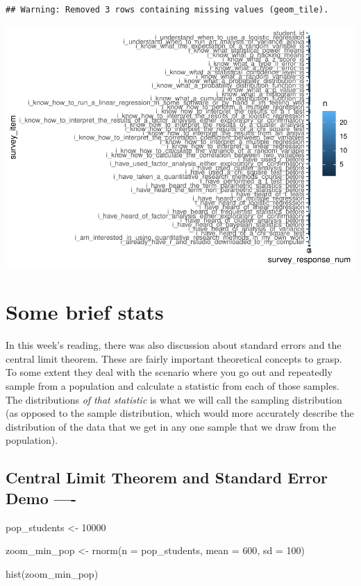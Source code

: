 \documentclass[
]{book}
\newenvironment{Shaded}{\begin{snugshade}}{\end{snugshade}}
\newcommand{\AttributeTok}[1]{\textcolor[rgb]{0.77,0.63,0.00}{#1}}
\newcommand{\DecValTok}[1]{\textcolor[rgb]{0.00,0.00,0.81}{#1}}
\newcommand{\FunctionTok}[1]{\textcolor[rgb]{0.00,0.00,0.00}{#1}}
\newcommand{\NormalTok}[1]{#1}
\newcommand{\OtherTok}[1]{\textcolor[rgb]{0.56,0.35,0.01}{#1}}
\begin{document}
\begin{verbatim}
## Warning: Removed 3 rows containing missing values (geom_tile).
\end{verbatim}

\includegraphics{test_course_notes_files/figure-latex/unnamed-chunk-17-1.pdf}

\hypertarget{some-brief-stats}{%
\section{Some brief stats}\label{some-brief-stats}}

In this week's reading, there was also discussion about standard errors and the central limit theorem. These are fairly important theoretical concepts to grasp. To some extent they deal with the scenario where you go out and repeatedly sample from a population and calculate a statistic from each of those samples. The distributions \emph{of that statistic} is what we will call the sampling distribution (as opposed to the sample distribution, which would more accurately describe the distribution of the data that we get in any one sample that we draw from the population).

\hypertarget{central-limit-theorem-and-standard-error-demo--}{%
\subsection{Central Limit Theorem and Standard Error Demo ----}\label{central-limit-theorem-and-standard-error-demo--}}

\begin{Shaded}
\begin{Highlighting}[]
\NormalTok{pop\_students }\OtherTok{\textless{}{-}} \DecValTok{10000}

\NormalTok{zoom\_min\_pop }\OtherTok{\textless{}{-}} \FunctionTok{rnorm}\NormalTok{(}\AttributeTok{n =}\NormalTok{ pop\_students, }\AttributeTok{mean =} \DecValTok{600}\NormalTok{, }\AttributeTok{sd =} \DecValTok{100}\NormalTok{)}

\FunctionTok{hist}\NormalTok{(zoom\_min\_pop)}
\end{Highlighting}
\end{Shaded}
\end{document}
